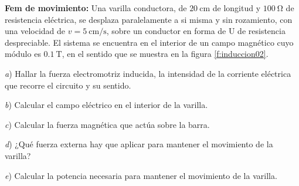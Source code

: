 \begin{center}
\end{center}
%
\begin{Exercise}\label{p:induccion02}
    \textbf{Fem de movimiento:} Una varilla conductora, de $\SI{20}{\centi\metre}$ de longitud y $\SI{100}{\ohm}$ de resistencia eléctrica, se desplaza paralelamente a si misma y sin rozamiento, con una velocidad de $v = \SI{5}{\centi\metre/\second}$, sobre un conductor en forma de U de resistencia despreciable. El sistema se encuentra en el interior de un campo magnético cuyo módulo es $\SI{0.1}{\tesla}$, en el sentido que se muestra en la figura \ref{f:induccion02}.\par
    \textit{a}) Hallar la fuerza electromotriz inducida, la intensidad de la corriente eléctrica que recorre el circuito y su sentido.\par
    \textit{b}) Calcular el campo eléctrico en el interior de la varilla.\par
    \textit{c}) Calcular la fuerza magnética que actúa sobre la barra.\par
    \textit{d}) ¿Qué fuerza externa hay que aplicar para mantener el movimiento de la varilla?\par
    \textit{e}) Calcular la potencia necesaria para mantener el movimiento de la varilla.
\end{Exercise}
